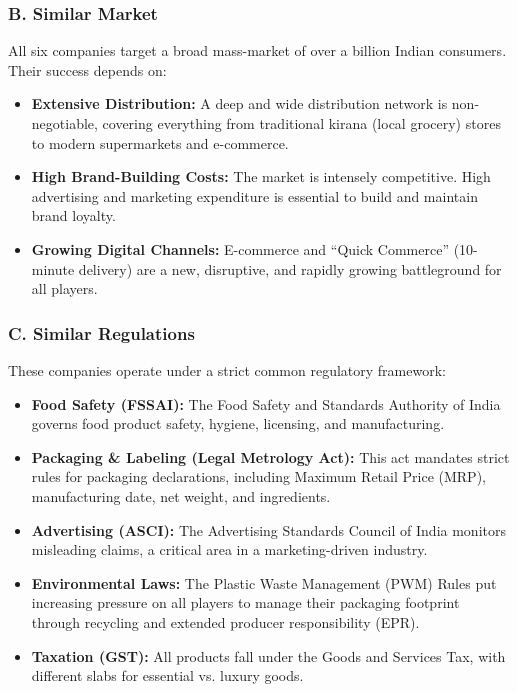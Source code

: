 \documentclass[12pt, a4paper]{report}
\begin{document}
\subsubsection*{B. Similar Market}

All six companies target a broad mass-market of over a billion Indian consumers. Their success depends on:

\begin{itemize}
    \item \textbf{Extensive Distribution:} A deep and wide distribution network is non-negotiable, covering everything from traditional kirana (local grocery) stores to modern supermarkets and e-commerce.
    
    \item \textbf{High Brand-Building Costs:} The market is intensely competitive. High advertising and marketing expenditure is essential to build and maintain brand loyalty.
    
    \item \textbf{Growing Digital Channels:} E-commerce and ``Quick Commerce'' (10-minute delivery) are a new, disruptive, and rapidly growing battleground for all players.
\end{itemize}

\subsubsection*{C. Similar Regulations}

These companies operate under a strict common regulatory framework:

\begin{itemize}
    \item \textbf{Food Safety (FSSAI):} The Food Safety and Standards Authority of India governs food product safety, hygiene, licensing, and manufacturing.
    
    \item \textbf{Packaging \& Labeling (Legal Metrology Act):} This act mandates strict rules for packaging declarations, including Maximum Retail Price (MRP), manufacturing date, net weight, and ingredients.
    
    \item \textbf{Advertising (ASCI):} The Advertising Standards Council of India monitors misleading claims, a critical area in a marketing-driven industry.
    
    \item \textbf{Environmental Laws:} The Plastic Waste Management (PWM) Rules put increasing pressure on all players to manage their packaging footprint through recycling and extended producer responsibility (EPR).
    
    \item \textbf{Taxation (GST):} All products fall under the Goods and Services Tax, with different slabs for essential vs. luxury goods.
\end{itemize}
\end{document}
